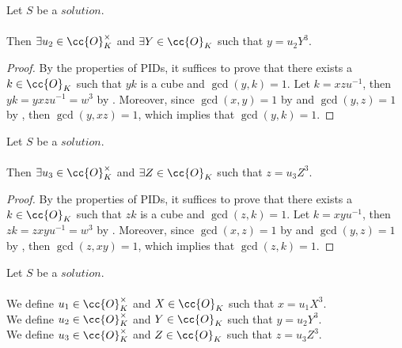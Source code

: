 \begin{lemma}
  \label{lmm:y_eq_unit_mul_cube}
  \leanok
  Let $S$ be a $solution$.\\\\
  Then $\exists u_2 \in \cc{O}^\times_K$ and $\exists Y \in \cc{O}_K$
  such that $y = u_2 Y^3$.
\end{lemma}
\begin{proof}
  \leanok
  By the properties of PIDs, it suffices to prove that there exists a $k\in \cc{O}_K$ such that
  $yk$ is a cube and $\gcd(y,k)=1$.
  Let $k = xzu^{-1}$, then $yk = y x z u^{-1} = w^3$ by .
  Moreover, since $\gcd(x,y)=1$ by  and $\gcd(y,z)=1$ by ,
  then $\gcd(y,xz)=1$, which implies that $\gcd(y,k)=1$.
\end{proof}

\begin{lemma}
  \label{lmm:z_eq_unit_mul_cube}
  \leanok
  Let $S$ be a $solution$.\\\\
  Then $\exists u_3 \in \cc{O}^\times_K$ and $\exists Z \in \cc{O}_K$
  such that $z = u_3  Z^3$.
\end{lemma}
\begin{proof}
  \leanok
  By the properties of PIDs, it suffices to prove that there exists a $k\in \cc{O}_K$ such that
  $zk$ is a cube and $\gcd(z,k)=1$.
  Let $k = xyu^{-1}$, then $zk = z x y u^{-1} = w^3$ by .
  Moreover, since $\gcd(x,z)=1$ by  and $\gcd(y,z)=1$ by ,
  then $\gcd(z,xy)=1$, which implies that $\gcd(z,k)=1$.
\end{proof}

\begin{definition}[$u_1,u_2,u_3,X,Y,Z$]
  \label{def:Solution_u1_u2_u3_u4_u5_X_Y_Z}
  \leanok
  Let $S$ be a $solution$.\\\\
  We define $u_1 \in \cc{O}^\times_K$ and $X \in \cc{O}_K$
  such that $x = u_1 X^3$.\\
  We define $u_2 \in \cc{O}^\times_K$ and $Y \in \cc{O}_K$
  such that $y = u_2 Y^3$.\\
  We define $u_3 \in \cc{O}^\times_K$ and $Z \in \cc{O}_K$
  such that $z = u_3 Z^3$.\\
\end{definition}

